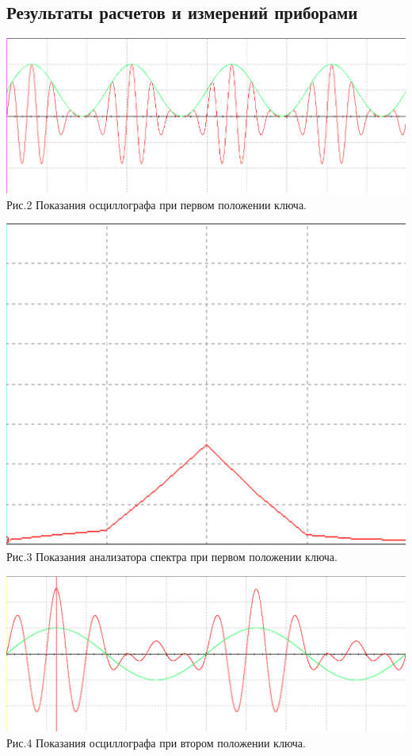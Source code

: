\documentclass[11pt]{article}
\begin{document}
\subsection{Результаты расчетов и измерений приборами}
\begin{center}
    \includegraphics[width=1\linewidth]{img/first1.png}
        Рис.2 Показания осциллографа при первом положении ключа.
\end{center}

\begin{center}
    \includegraphics[scale=0.25]{img/first2.png}\\
        Рис.3 Показания анализатора спектра при первом положении ключа.
\end{center}


\begin{center}
    \includegraphics[width=1\linewidth]{img/first3.png}
        Рис.4 Показания осциллографа при втором положении ключа.
\end{center}
\end{document}
